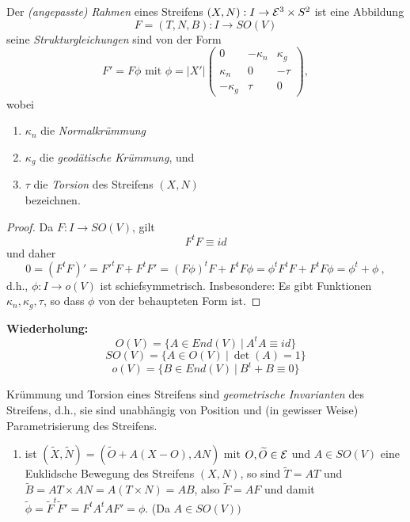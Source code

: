 \begin{lemma, definition}
	
	Der \emph{(angepasste) Rahmen} eines Streifens $(X,N): I\rightarrow\mathcal E^3\times S^2$ ist eine Abbildung \[ F=(T,N,B): I\rightarrow SO(V) \] seine \emph{Strukturgleichungen} sind von der Form \[ F' = F \phi \text{ mit } \phi =|X'| \begin{pmatrix}
	0 & - \kappa_n & \kappa_g \\
	\kappa_n & 0 & -\tau\\
	-\kappa_g & \tau & 0
	\end{pmatrix}, \] wobei\begin{enumerate}
		\item $\kappa_n$ die \emph{Normalkrümmung}
		\item $\kappa_g$ die \emph{geodätische Krümmung}, und
		\item $\tau$ die \emph{Torsion} des Streifens $(X,N)$ \\ bezeichnen.
		
	\end{enumerate}

\begin{proof}
	Da $F: I \rightarrow SO(V)$, gilt \[F^tF \equiv id\] und daher \[ 0 = (F^tF)' = F'^tF + F^tF' = (F\phi)^tF + F^tF\phi = \phi^tF^tF + F^tF\phi = \phi^t+ \phi  ~,\] d.h., $\phi:I \rightarrow o(V)$ ist schiefsymmetrisch. Insbesondere: Es gibt Funktionen $\kappa_n, \kappa_g, \tau$, so dass $\phi$ von der behaupteten Form ist.
\end{proof}

\textbf{Wiederholung:}
$$O(V) = \{ A \in End(V) ~ | ~ A^tA\equiv id \}$$
$$SO(V) = \{ A \in O(V) ~ | ~\det(A) = 1 \}$$
$$o(V) = \{ B \in End(V) ~ | ~ B^t +B \equiv 0 \}$$

\begin{remark}
	Krümmung und Torsion eines Streifens sind \emph{geometrische Invarianten} des Streifens, d.h., sie sind unabhängig von Position und (in gewisser Weise) Parametrisierung des Streifens.
	
	\begin{enumerate}
		\item ist $(\widetilde{X}, \widetilde{N}) = (\widetilde{O} + A(X-O), AN)$ mit $O,\widetilde{O} \in \mathcal E$ und $A \in SO(V)$ eine Euklidsche Bewegung des Streifens $(X,N)$, so sind $\widetilde{T}= AT$ und $\widetilde{B}= AT\times AN = A(T\times N) = AB$, also $\widetilde{F}=AF$ und damit $\widetilde{\phi} = \widetilde{F}^t\widetilde{F}'= F^tA^tAF' = \phi$. (Da $A \in SO(V))$
		

\end{enumerate}
\end{remark}
\end{lemma, definition}
